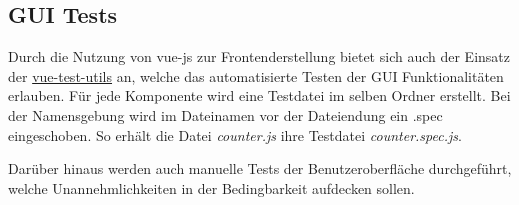 \subsection{GUI Tests}
Durch die Nutzung von vue-js zur Frontenderstellung bietet sich auch der Einsatz der \href{https://vue-test-utils.vuejs.org/en/}{vue-test-utils} an, welche das automatisierte Testen der GUI Funktionalitäten erlauben. Für jede Komponente wird eine Testdatei im selben Ordner erstellt. Bei der Namensgebung wird im Dateinamen vor der Dateiendung ein .spec eingeschoben. So erhält die Datei \textit{counter.js} ihre Testdatei \textit{counter.spec.js}.

Darüber hinaus werden auch manuelle Tests der Benutzeroberfläche durchgeführt, welche Unannehmlichkeiten in der Bedingbarkeit aufdecken sollen.